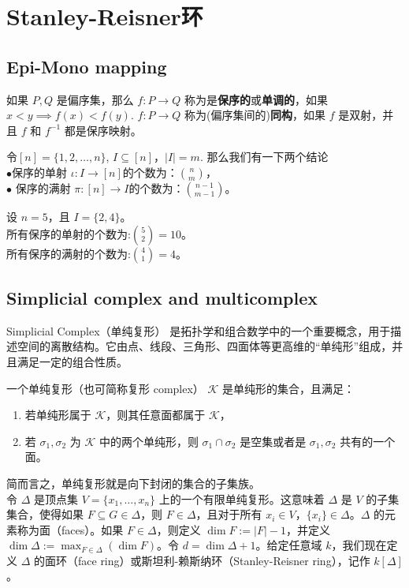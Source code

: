\section{Stanley-Reisner环}

\subsection{Epi-Mono mapping}
\begin{definition}
 如果 $P, Q$ 是偏序集，那么 $f: P \to Q$ 称为是\textbf{保序的}或\textbf{单调的}，如果
$ x < y \implies f(x) < f(y). $
$f: P \to Q$ 称为(偏序集间的)\textbf{同构}，如果 $f$ 是双射，并且 $f$ 和 $f^{-1}$ 都是保序映射。
\end{definition}\label{Ehrhart1}

令$[n] = \{1, 2, \ldots, n\}$, $I \subseteq [n]$，$|I| = m$.
那么我们有一下两个结论\\
$\bullet$保序的单射 $\iota: I \rightarrow [n]$的个数为：$\binom{n}{m}$，\\
$\bullet$ 保序的满射 $\pi: [n] \rightarrow I$的个数为：$\binom{n-1}{m-1}。 $  

\begin{example}
设 $ n = 5 $，且 $ I = \{2, 4\} $。\\
所有保序的单射的个数为:$\binom{5}{2} = 10。$\\
所有保序的满射的个数为:$\binom{4}{1} = 4。$
\end{example}

\subsection{Simplicial complex and multicomplex}
Simplicial Complex（单纯复形） 是拓扑学和组合数学中的一个重要概念，用于描述空间的离散结构。它由点、线段、三角形、四面体等更高维的“单纯形”组成，并且满足一定的组合性质。

\begin{definition}
一个单纯复形（也可简称复形 complex） $\mathcal{K}$ 是单纯形的集合，且满足：
\begin{enumerate}
    \item 若单纯形属于 $\mathcal{K}$，则其任意面都属于 $\mathcal{K}$，
    \item 若 $\sigma_1, \sigma_2$ 为 $\mathcal{K}$ 中的两个单纯形，则 $\sigma_1 \cap \sigma_2$ 是空集或者是 $\sigma_1, \sigma_2$ 共有的一个面。
\end{enumerate}
\end{definition}
简而言之，单纯复形就是向下封闭的集合的子集族。\\
令 $\Delta$ 是顶点集 $V = \{x_1, \ldots, x_n\}$ 上的一个有限单纯复形。这意味着 $\Delta$ 是 $V$ 的子集集合，使得如果 $F \subseteq G \in \Delta$，则 $F \in \Delta$，且对于所有 $x_i \in V$，$\{x_i\} \in \Delta$。$\Delta$ 的元素称为面（faces）。如果 $F \in \Delta$，则定义 $\dim F := |F| - 1$，并定义 $\dim \Delta := \max_{F \in \Delta} (\dim F)$。令 $d = \dim \Delta + 1$。给定任意域 $k$，我们现在定义 $\Delta$ 的面环（face ring）或斯坦利-赖斯纳环（Stanley-Reisner ring），记作 $k[\Delta]$。

